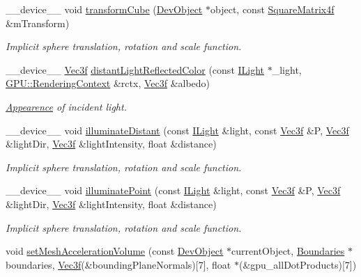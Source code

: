 \begin{DoxyCompactItemize}
\+\_\+\+\_\+device\+\_\+\+\_\+ void \hyperlink{group__intersection__test__prperties_ga00e56ff810e7ba397e903acf50626b55}{transform\+Cube} (\hyperlink{class_dev_object}{Dev\+Object} $\ast$object, const \hyperlink{class_square_matrix4}{Square\+Matrix4f} \&m\+Transform)
\begin{DoxyCompactList}\small\item\em Implicit sphere translation, rotation and scale function. \end{DoxyCompactList}\item 
\+\_\+\+\_\+device\+\_\+\+\_\+ \hyperlink{class_vec3}{Vec3f} \hyperlink{group__intersection__test__prperties_ga19abb6bc50199d8583aafedd0e044b7e}{distant\+Light\+Reflected\+Color} (const \hyperlink{class_i_light}{I\+Light} $\ast$\+\_\+light, \hyperlink{struct_g_p_u_1_1_rendering_context}{G\+P\+U\+::\+Rendering\+Context} \&rctx, \hyperlink{class_vec3}{Vec3f} \&albedo)
\begin{DoxyCompactList}\small\item\em \hyperlink{struct_appearence}{Appearence} of incident light. \end{DoxyCompactList}\item 
\+\_\+\+\_\+device\+\_\+\+\_\+ void \hyperlink{group__intersection__test__prperties_ga6a438778f6ed8683785d7a892a05d312}{illuminate\+Distant} (const \hyperlink{class_i_light}{I\+Light} \&light, const \hyperlink{class_vec3}{Vec3f} \&P, \hyperlink{class_vec3}{Vec3f} \&light\+Dir, \hyperlink{class_vec3}{Vec3f} \&light\+Intensity, float \&distance)
\begin{DoxyCompactList}\small\item\em Implicit sphere translation, rotation and scale function. \end{DoxyCompactList}\item 
\+\_\+\+\_\+device\+\_\+\+\_\+ void \hyperlink{group__intersection__test__prperties_gab3c663df5b5a29d04083e7793bce50d5}{illuminate\+Point} (const \hyperlink{class_i_light}{I\+Light} \&light, const \hyperlink{class_vec3}{Vec3f} \&P, \hyperlink{class_vec3}{Vec3f} \&light\+Dir, \hyperlink{class_vec3}{Vec3f} \&light\+Intensity, float \&distance)
\begin{DoxyCompactList}\small\item\em Implicit sphere translation, rotation and scale function. \end{DoxyCompactList}\item 
void \hyperlink{group__intersection__test__prperties_ga672ecbee3aea2f5567ad7a2611feef3e}{set\+Mesh\+Acceleration\+Volume} (const \hyperlink{class_dev_object}{Dev\+Object} $\ast$current\+Object, \hyperlink{class_boundaries}{Boundaries} $\ast$boundaries, \hyperlink{class_vec3}{Vec3f}(\&bounding\+Plane\+Normals)\mbox{[}7\mbox{]}, float $\ast$(\&gpu\+\_\+all\+Dot\+Products)\mbox{[}7\mbox{]})

\end{DoxyCompactItemize}

